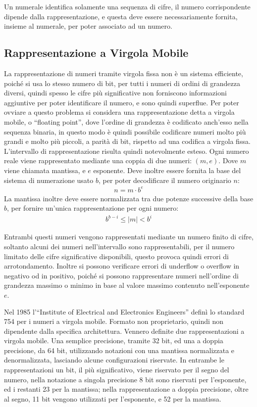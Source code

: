 \documentclass{article}
\numberwithin{equation}{subsection}
\begin{document}
Un numerale identifica solamente una sequenza di cifre, il numero corrispondente dipende dalla rappresentazione, e questa deve essere necessariamente fornita, insieme al numerale, per poter associato ad un numero. 

\subsection{Rappresentazione a Virgola Mobile}

La rappresentazione di numeri tramite virgola fissa non è un sistema efficiente, poiché si usa lo stesso numero di bit, per tutti i numeri di ordini di grandezza diversi, quindi spesso le cifre più significative 
non forniscono informazioni aggiuntive per poter identificare il numero, e sono quindi superflue. Per poter ovviare a questo problema si considera una rappresentazione detta a virgola mobile, o ``floating point'', 
dove l'ordine di grandezza è codificato anch'esso nella sequenza binaria, in questo modo è quindi possibile codificare numeri molto più grandi e molto più piccoli, a parità di bit, rispetto ad una codifica a virgola 
fissa. L'intervallo di rappresentazione risulta quindi notevolmente esteso. 
Ogni numero reale viene rappresentato mediante una coppia di due numeri: $(m, e)$. Dove $m$ viene chiamata mantissa, e $e$ esponente. Deve inoltre essere fornita la base del sistema di numerazione usato $b$, per poter 
decodificare il numero originario $n$: 
\begin{gather*}
    n=m\cdot b^e
\end{gather*}
La mantissa inoltre deve essere normalizzata tra due potenze successive della base $b$, per fornire un'unica rappresentazione per ogni numero:
\begin{gather*}
    b^{b-i}\leq|m|<b^i
\end{gather*}

Entrambi questi numeri vengono rappresentati mediante un numero finito di cifre, soltanto alcuni dei numeri nell'intervallo sono rappresentabili, per il numero limitato delle cifre significative disponibili, questo 
provoca quindi errori di arrotondamento. Inoltre si possono verificare errori di underflow o overflow in negativo od in positivo, poiché si possono rappresentare numeri nell'ordine di grandezza massimo o minimo 
in base al valore massimo contenuto nell'esponente $e$. 

Nel 1985 l'``Institute of Electrical and Electronics Engineers'' definì lo standard 754 per i numeri a virgola mobile. Formato non proprietario, quindi non dipendente dalla specifica architettura. 
Vennero definite due rappresentazioni a virgola mobile. Una semplice precisione, tramite 32 bit, ed una a doppia precisione, da 64 bit, utilizzando notazioni con una mantissa normalizzata e denormalizzata, lasciando 
alcune configurazioni riservate. 
In entrambe le rappresentazioni un bit, il più significativo, viene riservato per il segno del numero, nella notazione a singola precisione 8 bit sono riservati per l'esponente, ed i restanti 23 per la mantissa; 
nella rappresentazione a doppia precisione, oltre al segno, 11 bit vengono utilizzati per l'esponente, e 52 per la mantissa. 
\end{document}
